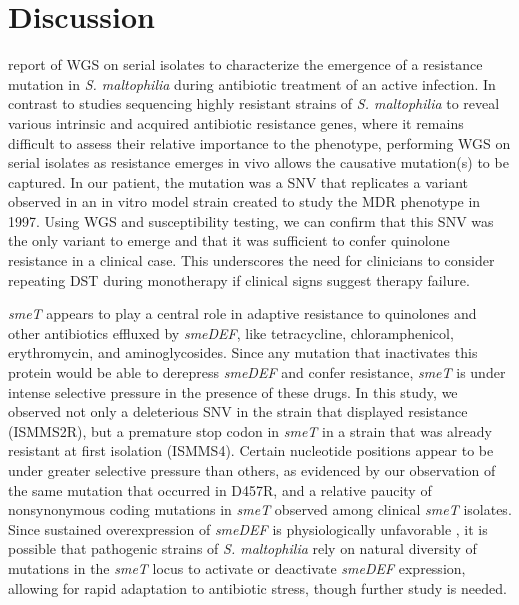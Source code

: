 \section{Discussion}

 report of WGS on serial isolates to characterize the emergence of a resistance mutation in \emph{S. maltophilia} during antibiotic treatment of an active infection. In contrast to studies sequencing highly resistant strains of \emph{S. maltophilia} to reveal various intrinsic and acquired antibiotic resistance genes,\autocite{Crossman2008,Zhao2015} where it remains difficult to assess their relative importance to the phenotype, performing WGS on serial isolates as resistance emerges in vivo allows the causative mutation(s) to be captured. In our patient, the mutation was a SNV that replicates a variant observed in an in vitro model strain created to study the MDR phenotype in 1997.\autocite{Alonso1997} Using WGS and susceptibility testing, we can confirm that this SNV was the only variant to emerge and that it was sufficient to confer quinolone resistance in a clinical case. This underscores the need for clinicians to consider repeating DST during monotherapy if clinical signs suggest therapy failure.

\emph{smeT} appears to play a central role in adaptive resistance to quinolones and other antibiotics effluxed by \emph{smeDEF}, like tetracycline, chloramphenicol, erythromycin, and aminoglycosides. Since any mutation that inactivates this protein would be able to derepress \emph{smeDEF} and confer resistance, \emph{smeT} is under intense selective pressure in the presence of these drugs. In this study, we observed not only a deleterious SNV in the strain that displayed resistance (ISMMS2R), but a premature stop codon in \emph{smeT} in a strain that was already resistant at first isolation (ISMMS4). Certain nucleotide positions appear to be under greater selective pressure than others, as evidenced by our observation of the same mutation that occurred in D457R, and a relative paucity of nonsynonymous coding mutations in \emph{smeT} observed among clinical \emph{smeT} isolates.\autocite{Sanchez2004} Since sustained overexpression of \emph{smeDEF} is physiologically unfavorable \autocite{Alonso2004}, it is possible that pathogenic strains of \emph{S. maltophilia} rely on natural diversity of mutations in the \emph{smeT} locus to activate or deactivate \emph{smeDEF} expression, allowing for rapid adaptation to antibiotic stress, though further study is needed.


